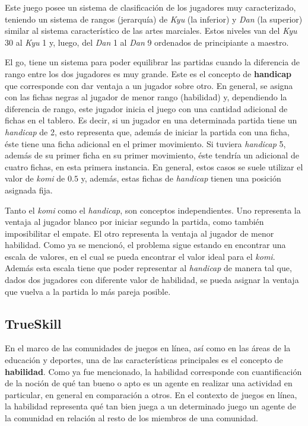 \documentclass[11pt,twoside,spanish]{report} %
\begin{document}
Este juego posee un sistema de clasificaci\'on de los jugadores muy caracterizado, teniendo un sistema de rangos (jerarqu\'ia) de \textit{Kyu} (la inferior) y \textit{Dan} (la superior) similar al sistema caracter\'istico de las artes marciales. 
Estos niveles van del \textit{Kyu} 30 al \textit{Kyu} 1 y, luego, del \textit{Dan} 1 al \textit{Dan} 9 ordenados de principiante a maestro.

El go, tiene un sistema para poder equilibrar las partidas cuando la diferencia de rango entre los dos jugadores es muy grande.
Este es el concepto de \textbf{handicap} que corresponde con dar ventaja a un jugador sobre otro.
En general, se asigna con las fichas negras al jugador de menor rango (habilidad) y, dependiendo la diferencia de rango, este jugador inicia el juego con una cantidad adicional de fichas en el tablero.
Es decir, si un jugador en una determinada partida tiene un \textit{handicap} de 2, esto representa que, adem\'as de iniciar la partida con una ficha, \'este tiene una ficha adicional en el primer movimiento.
Si tuviera \textit{handicap} 5, adem\'as de su primer ficha en su primer movimiento, \'este tendr\'ia un adicional de cuatro fichas, en esta primera instancia.
En general, estos casos se suele utilizar el valor de \emph{komi} de $0.5$ y, adem\'as, estas fichas de \textit{handicap} tienen una posici\'on asignada fija.

Tanto el \textit{komi} como el \textit{handicap}, son conceptos independientes.
Uno representa la ventaja al jugador blanco por iniciar segundo la partida, como tambi\'en imposibilitar el empate.
El otro representa la ventaja al jugador de menor habilidad.
Como ya se mencion\'o, el problema sigue estando en encontrar una escala de valores, en el cual se pueda encontrar el valor ideal para el \textit{komi}.
Adem\'as esta escala tiene que poder representar al \textit{handicap} de manera tal que, dados dos jugadores con diferente valor de habilidad, se pueda asignar la ventaja que vuelva a la partida lo m\'as pareja posible.

\subsection{TrueSkill}

En el marco de las comunidades de juegos en l\'inea, as\'i como en las \'areas de la educaci\'on y deportes, una de las caracter\'isticas principales es el concepto de \textbf{habilidad}.
Como ya fue mencionado, la habilidad corresponde con cuantificaci\'on de la noci\'on de qu\'e tan bueno o apto es un agente en realizar una actividad en particular, en general en comparaci\'on a otros.
En el contexto de juegos en l\'inea, la habilidad representa qu\'e tan bien juega a un determinado juego un agente de la comunidad en relaci\'on al resto de los miembros de una comunidad.
\end{document}
